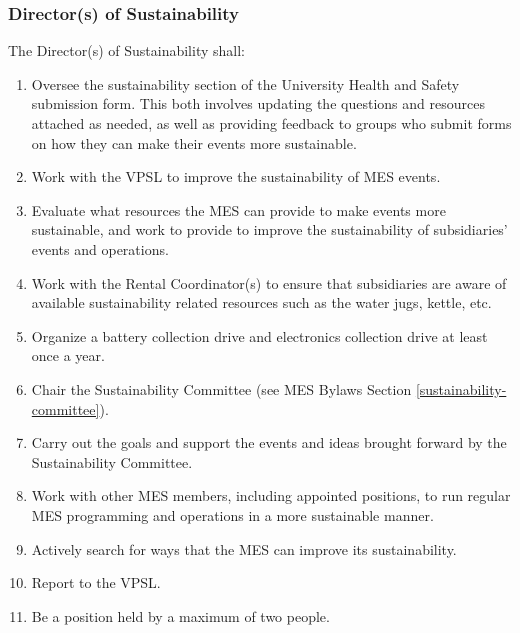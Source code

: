 
\subsubsection{Director(s) of Sustainability}
\label{directors-of-sustainability}
The Director(s) of Sustainability shall:

\begin{enumerate}
 \item
  Oversee the sustainability section of the University Health and Safety submission form. This both involves updating the questions and resources attached as needed, as well as providing feedback to groups who submit forms on how they can make their events more sustainable.
 \item
  Work with the VPSL to improve the sustainability of MES events.
 \item
  Evaluate what resources the MES can provide to make events more sustainable, and work to provide to improve the sustainability of subsidiaries' events and operations.
 \item
  Work with the Rental Coordinator(s) to ensure that subsidiaries are aware of available sustainability related resources such as the water jugs, kettle, etc.
 \item
  Organize a battery collection drive and electronics collection drive at least once a year.
 \item
  Chair the Sustainability Committee (see MES Bylaws Section \ref{sustainability-committee}).
 \item
  Carry out the goals and support the events and ideas brought forward by the Sustainability Committee.
 \item
  Work with other MES members, including appointed positions, to run regular MES programming and operations in a more sustainable manner.
 \item
  Actively search for ways that the MES can improve its sustainability.
 \item
  Report to the VPSL.
 \item
  Be a position held by a maximum of two people.

\end{enumerate}